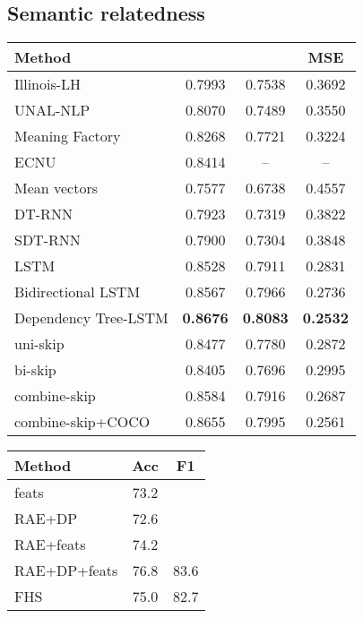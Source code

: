\documentclass{article} \usepackage{nips15submit_e,times}
\begin{document}
\subsection{Semantic relatedness}

\begin{table}
\small
\centering
\parbox{.6\linewidth}{
\begin{tabular}{lccc}
\toprule \bf Method & \bf  & \bf  & \bf MSE \\ \midrule
Illinois-LH \cite{lai2014illinois} & 0.7993  & 0.7538 & 0.3692 \\
UNAL-NLP \cite{jimenez2014unal} & 0.8070 & 0.7489 & 0.3550 \\
Meaning Factory \cite{bjerva2014meaning}  & 0.8268 & 0.7721 & 0.3224 \\
ECNU \cite{zhao2014ecnu} & 0.8414 & -- & -- \\ \midrule
Mean vectors \cite{tai2015improved} & 0.7577 & 0.6738 & 0.4557 \\
DT-RNN \cite{socher2014grounded} & 0.7923 & 0.7319 & 0.3822  \\
SDT-RNN \cite{socher2014grounded}  & 0.7900 & 0.7304 & 0.3848  \\
LSTM \cite{tai2015improved} & 0.8528 & 0.7911 & 0.2831 \\
Bidirectional LSTM \cite{tai2015improved} & 0.8567 & 0.7966 & 0.2736 \\
Dependency Tree-LSTM \cite{tai2015improved} & \textbf{0.8676} & \textbf{0.8083} & \textbf{0.2532} \\ \midrule
uni-skip   & 0.8477 & 0.7780 & 0.2872  \\
bi-skip & 0.8405 & 0.7696 & 0.2995 \\
combine-skip & 0.8584 & 0.7916 & 0.2687 \\ 
combine-skip+COCO & 0.8655 & 0.7995 & 0.2561 \\ \bottomrule
\end{tabular}
}
\centering
\parbox{.35\linewidth}{
\begin{tabular}{lcc}
\toprule \bf Method & \bf Acc & \bf F1 \\ \midrule
feats \cite{socher2011dynamic} & 73.2 & \\
RAE+DP \cite{socher2011dynamic} & 72.6 & \\
RAE+feats \cite{socher2011dynamic} & 74.2 & \\
RAE+DP+feats \cite{socher2011dynamic} & 76.8 & 83.6 \\ \midrule
FHS \cite{finch2005using} & 75.0 & 82.7 \\

\end{tabular}}
\end{table}
\end{document}
